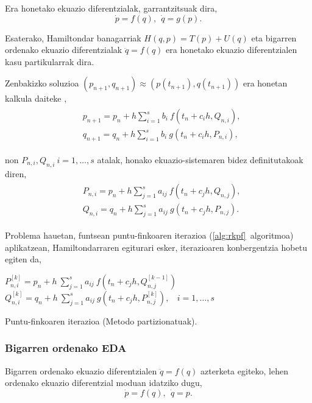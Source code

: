 Era honetako ekuazio diferentzialak, garrantzitsuak dira,
\begin{equation*}
\dot{p}=f(q), \ \ \dot{q}=g(p).
\end{equation*}

Esaterako, Hamiltondar banagarriak $H(q,p)=T(p)+U(q)$ eta bigarren ordenako ekuazio diferentzialak $\ddot{q}=f(q)$ era honetako ekuazio diferentzialen kasu partikularrak dira.

Zenbakizko soluzioa $(p_{n+1},q_{n+1}) \approx (p(t_{n+1}),q(t_{n+1}))$ era honetan kalkula daiteke \cite{JMSanz-Serna1994},
\begin{align}
\begin{split}
&p_{n+1}=p_n+ h \sum\limits_{i=1}^{s} b_i \ f(t_n+c_ih,Q_{n,i}),\\
&q_{n+1}=q_n+ h \sum\limits_{i=1}^{s} b_i \ g(t_n+c_ih,P_{n,i}),
\end{split}
\end{align}

non $P_{n,i},Q_{n,i} \ i=1,\dots,s$ atalak, honako ekuazio-sistemaren bidez definitutakoak diren, 
\begin{align}
\begin{split}
&P_{n,i} =p_n+ h \sum\limits_{j=1}^{s} a_{ij} \ f(t_n+c_jh,Q_{n,j}), \\
&Q_{n,i} =q_n+ h \sum\limits_{j=1}^{s} a_{ij} \ g(t_n+c_jh,P_{n,j}).
\end{split}
\end{align}

Problema hauetan,  funtsean puntu-finkoaren iterazioa (\ref{alg:rkpf}~algoritmoa) aplikatzean, Hamiltondarraren egiturari esker, iterazioaren konbergentzia hobetu egiten da,   

\begin{algorithm}[H]
  {
  \BlankLine
   $P_{n,i}^{[k]}=p_{n}+ h \ \sum\limits_{j=1}^{s} a_{ij} \ f(t_n+c_jh,Q_{n,j}^{[k-1]})$\; 
   $Q_{n,i}^{[k]}=q_{n}+ h \ \sum\limits_{j=1}^{s} a_{ij} \ g(t_n+c_jh,P_{n,j}^{[k]}), \ \ \ \ i=1,\dots,s $\; 
  }
 \caption{Puntu-finkoaren iterazioa (Metodo partizionatuak).}
 \label{alg:rkfppart}
\end{algorithm}


\subsubsection*{Bigarren ordenako EDA}

Bigarren ordenako ekuazio diferentzialen $\ddot{q}=f(q)$ azterketa egiteko, lehen ordenako ekuazio diferentzial moduan idatziko dugu,
\begin{equation*}
\dot{p}=f(q), \ \ \dot{q}=p.
\end{equation*}

